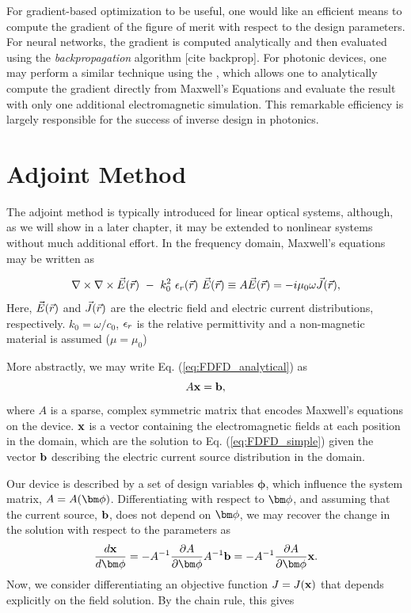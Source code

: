 For gradient-based optimization to be useful, one would like an efficient means to compute the gradient of the figure of merit with respect to the design parameters.
For neural networks, the gradient is computed analytically and then evaluated using the \textit{backpropagation} algorithm [cite backprop].
For photonic devices, one may perform a similar technique using the , which allows one to analytically compute the gradient directly from Maxwell's Equations and evaluate the result with only one additional electromagnetic simulation.
This remarkable efficiency is largely responsible for the success of inverse design in photonics.

\section{Adjoint Method}

The adjoint method is typically introduced for linear optical systems, although, as we will show in a later chapter, it may be extended to nonlinear systems without much additional effort.
In the frequency domain, Maxwell's equations may be written as

\begin{equation}
\dcurl \vE (\vr)\ -\ k_0^2\ \eps_r(\vr)\ \vE(\vr) \equiv A\vE(\vr) = -i\mu_0\omega\vJ(\vr),
\label{eq:FDFD_analytical}
\end{equation}
%
Here, $\vec{E}(\vec{r})$ and $\vec{J}(\vec{r})$ are the electric field and electric current distributions, respectively. $k_0 = \omega/c_0$, $\epsilon_r$ is the relative permittivity and a non-magnetic material is assumed ($\mu = \mu_0$)

More abstractly, we may write Eq. (\ref{eq:FDFD_analytical}) as
%
\begin{equation}
A \mathbf{x} = \mathbf{b},
\label{eq:FDFD_simple}
\end{equation}
%
where $A$ is a sparse, complex symmetric matrix that encodes Maxwell's equations on the device.  
$\mathbf{x}$ is a vector containing the electromagnetic fields at each position in the domain, which are the solution to Eq. (\ref{eq:FDFD_simple}) given the vector $\mathbf{b}$ describing the electric current source distribution in the domain.

Our device is described by a set of design variables $\bm{\phi}$, which influence the system matrix, $A = A(\bfphi)$.
Differentiating  with respect to $\bfphi$, and assuming that the current source, $\mathbf{b}$, does not depend on $\bfphi$, we may recover the change in the solution with respect to the parameters as
%
\begin{equation}
\dfrac{\bfx}{\bfphi} = -\invA \pfrac{A}{\bfphi} \invA \bfb = -\invA \pfrac{A}{\bfphi}\bfx
\label{eq:dEdgamma}.
\end{equation}
%
Now, we consider differentiating an objective function $J = J(\mathbf{x})$ that depends explicitly on the field solution.
By the chain rule, this gives

